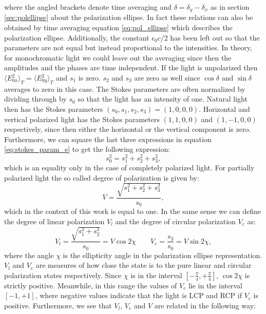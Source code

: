where the angled brackets denote time averaging and $\delta=\delta_y-\delta_x$ as in section \ref{sec:polellipse} about the polarization ellipse. In fact these relations can also be obtained by time averaging equation \ref{eq:pol_ellipse} which describes the polarization ellipse. Additionally, the constant $\epsilon_0 c / 2$ has been left out so that the parameters are not equal but instead proportional to the intensities. In theory, for monochromatic light we could leave out the averaging since then the amplitudes and the phases are time independent. If the light is unpolarized then $\langle E_{0x}^2 \rangle_T = \langle E_{0y}^2 \rangle_T$ and $s_1$ is zero. $s_2$ and $s_3$ are zero as well since $\cos \delta$ and $\sin \delta$ averages to zero in this case. The Stokes parameters are often normalized by dividing through by $s_0$ so that the light has an intensity of one. Natural light then has the Stokes parameters $(s_0,s_1,s_2,s_3)=(1,0,0,0)$. Horizontal and vertical polarized light has the Stokes parameters $(1,1,0,0)$ and $(1,-1,0,0)$ respectively, since then either the horizontal or the vertical component is zero. Furthermore, we can square the last three expressions in equation \ref{eq:stokes_param_e} to get the following expression:
\begin{equation}
    \label{eq:stokes_char_eq}
    s_0^2 = s_1^2 + s_2^2 + s_3^2,
\end{equation}
which is an equality only in the case of completely polarized light. For partially polarized light the so called degree of polarization is given by:
\begin{equation}
    V = \frac{\sqrt{s_1^2 + s_2^2 + s_3^2}}{s_0},
\end{equation}
which in the context of this work is equal to one. In the same sense we can define the degree of linear polarization $V_l$ and the degree of circular polarization $V_c$ as:
\begin{equation}
    V_l = \frac{\sqrt{s_1^2+s_2^2}}{s_0} = V \cos 2\chi \qquad V_c = \frac{s_3}{s_0} = V \sin 2\chi,
\end{equation} %
where the angle $\chi$ is the ellipticity angle in the polarization ellipse representation. $V_l$ and $V_c$ are measures of how close the state is to the pure linear and circular polarization states respectively. Since $\chi$ is in the interval $\left[-\frac{\pi}{4}, +\frac{\pi}{4}\right]$, $\cos 2\chi$ is strictly positive. Meanwhile, in this range the values of $V_c$ lie in the interval $\left[-1, +1\right]$, where negative values indicate that the light is LCP and RCP if $V_c$ is positive. Furthermore, we see that $V_l$, $V_c$ and $V$ are related in the following way:
